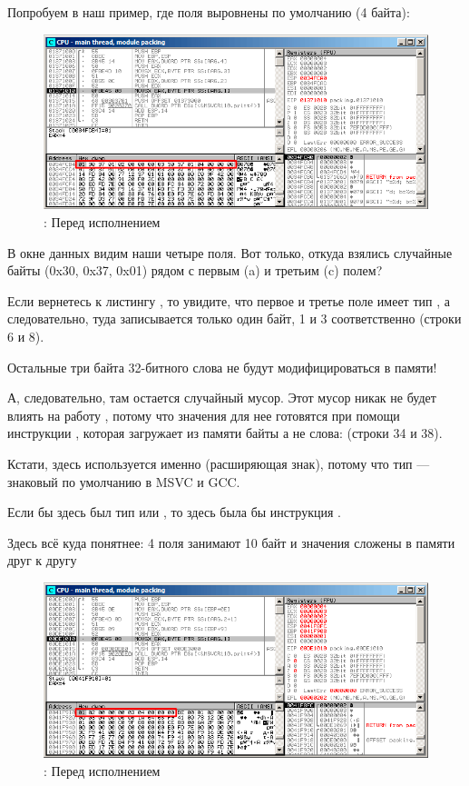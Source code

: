 ﻿\clearpage
{}
\myindex{\olly}

Попробуем в \olly наш пример, где поля выровнены по умолчанию (4 байта):

\begin{figure}[H]
\centering
\includegraphics[scale=\FigScale]{patterns/15_structs/4_packing/olly_packing_4.png}
\caption{\olly: Перед исполнением \printf}
\label{fig:packing_olly_4}
\end{figure}

В окне данных видим наши четыре поля.
Вот только, откуда взялись случайные байты (0x30, 0x37, 0x01) рядом с первым (a) и третьим (c) полем?

Если вернетесь к листингу , то увидите, что первое и третье поле имеет
тип \Tchar, а следовательно, туда записывается только один байт, 1 и 3 соответственно (строки 6 и 8).

Остальные три байта 32-битного слова не будут модифицироваться в памяти!

А, следовательно, там остается случайный мусор.
Этот мусор никак не будет влиять на работу \printf,
потому что значения для нее готовятся при помощи инструкции \MOVSX, которая загружает
из памяти байты а не слова: 
 (строки 34 и 38).

Кстати, здесь используется именно \MOVSX (расширяющая знак), потому что тип 
\Tchar --- знаковый по умолчанию в MSVC и GCC.

Если бы здесь был тип  или , 
то здесь была бы инструкция \MOVZX.

\clearpage
{}
\myindex{\olly}

Здесь всё куда понятнее: 4 поля занимают 10 байт и значения сложены в памяти друг к другу

\begin{figure}[H]
\centering
\includegraphics[scale=\FigScale]{patterns/15_structs/4_packing/olly_packing_1.png}
\caption{\olly: Перед исполнением \printf}
\label{fig:packing_olly_1}
\end{figure}
